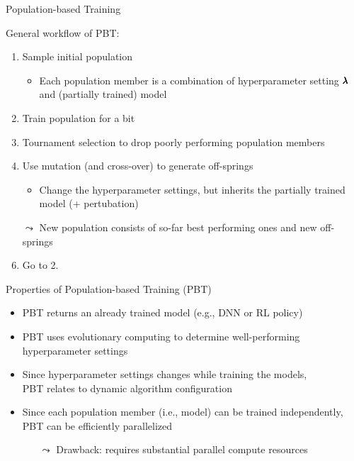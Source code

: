 \begin{frame}[c]{Population-based Training }

General workflow of PBT:

\begin{enumerate}
	\item Sample initial population
	\begin{itemize}
		\item Each population member is a combination of hyperparameter setting $\pmb{\lambda}$ and (partially trained) model
	\end{itemize}
	\pause
	\item Train population for a bit 
	\pause
	\item Tournament selection to drop poorly performing population members
	\pause
	\item Use mutation (and cross-over) to generate off-springs
	\begin{itemize}
		\item Change the hyperparameter settings, but inherits the partially trained model (+ pertubation)
	\end{itemize}
	\pause
	\item[$\leadsto$] New population consists of so-far best performing ones and new off-springs
	\pause
	\item Go to 2.
\end{enumerate}


\end{frame}
\begin{frame}[c]{Properties of Population-based Training (PBT)}

\begin{itemize}
	\item PBT returns an already trained model (e.g., DNN or RL policy)
	\bigskip
	\pause
	\item PBT uses evolutionary computing to determine well-performing hyperparameter settings
	\bigskip
	\pause
	\item Since hyperparameter settings changes while training the models,\\ PBT relates to dynamic algorithm configuration
	\bigskip
	\pause
	\item Since each population member (i.e., model) can be trained independently,\\ PBT can be efficiently parallelized
	\begin{itemize}
		\item[$\leadsto$] Drawback: requires substantial parallel compute resources
	\end{itemize}
\end{itemize}

\end{frame}
